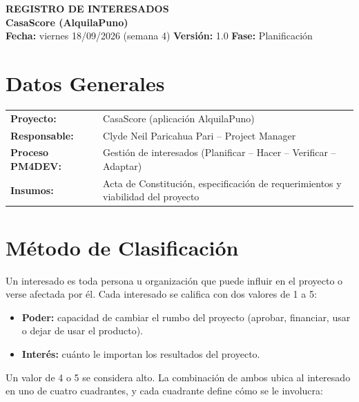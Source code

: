 \documentclass[11pt,a4paper]{article}
\begin{document}
\begin{center}
    {\Large \textbf{\textcolor{AzulUNA}{REGISTRO DE INTERESADOS}}}\\[3pt]
    {\normalsize \textbf{CasaScore (AlquilaPuno)}}\\[4pt]
    \footnotesize \textbf{Fecha:} viernes 18/09/2026 (semana 4) \quad \textbar\quad \textbf{Versión:} 1.0 \quad \textbar\quad \textbf{Fase:} Planificación
\end{center}

\vspace{0.1cm}

\section{Datos Generales}
\noindent\begin{tabularx}{\textwidth}{@{}P{4.2cm} L@{}}
\toprule
\textbf{Proyecto:} & CasaScore (aplicación AlquilaPuno) \\
\textbf{Responsable:} & Clyde Neil Paricahua Pari -- Project Manager \\
\textbf{Proceso PM4DEV:} & Gestión de interesados (Planificar -- Hacer -- Verificar -- Adaptar) \\
\textbf{Insumos:} & Acta de Constitución, especificación de requerimientos y viabilidad del proyecto \\
\bottomrule
\end{tabularx}

\section{Método de Clasificación}
Un interesado es toda persona u organización que puede influir en el proyecto o verse afectada por él. Cada interesado se califica con dos valores de 1 a 5:
\begin{itemize}[leftmargin=*]
    \item \textbf{Poder:} capacidad de cambiar el rumbo del proyecto (aprobar, financiar, usar o dejar de usar el producto).
    \item \textbf{Interés:} cuánto le importan los resultados del proyecto.
\end{itemize}
Un valor de 4 o 5 se considera alto. La combinación de ambos ubica al interesado en uno de cuatro cuadrantes, y cada cuadrante define cómo se le involucra:
\end{document}

